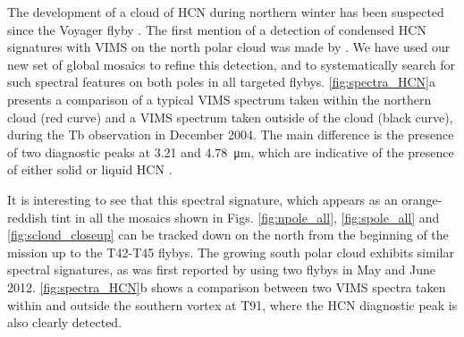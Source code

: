 \documentclass[preprint,twocolumn,5p,authoryear,compress,colorlinks=true]{elsarticle}
\newcommand{\figref}[1]{\autoref{fig:#1}}
\begin{document}
The development of a cloud of HCN during northern winter has been suspected since the Voyager flyby \citep[e.g.][]{Coustenis1999,Samuelson2007,Anderson2010}.
The first mention of a detection of condensed HCN signatures with VIMS on the north polar cloud was made by \cite{Clark2010}. We have used our new set of global mosaics to refine this detection, and to systematically search for such spectral features on both poles in all targeted flybys. \figref{spectra_HCN}a presents a comparison of a typical VIMS spectrum taken within the northern cloud (red curve) and a VIMS spectrum taken outside of the cloud (black curve), during the Tb observation in December 2004. The main difference is the presence of two diagnostic peaks at \num{3.21} and \SI{4.78}{\um}, which are indicative of the presence of either solid or liquid HCN \citep{Clark2010}.

It is interesting to see that this spectral signature, which appears as an orange-reddish tint in all the mosaics shown in Figs. \autoref{fig:npole_all}, \ref{fig:spole_all} and \ref{fig:scloud_closeup} can be tracked down on the north from the beginning of the mission up to the T42-T45 flybys. The growing south polar cloud exhibits similar spectral signatures, as was first reported by \cite{deKok2014} using two flybys in May and June 2012. \figref{spectra_HCN}b shows a comparison between two VIMS spectra taken within and outside the southern vortex at T91, where the HCN diagnostic peak is also clearly detected.

\end{document}
